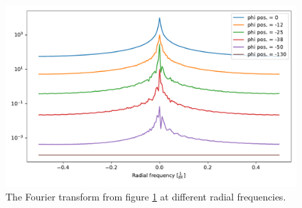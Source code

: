 \begin{figure}[H]
	\centering
		\includegraphics[width=1.0\textwidth]{pics/simspi_radialfreq.pdf}
		\caption{The Fourier transform from figure \ref{fig:simspi_radialfreq} at different radial frequencies.}
		\label{fig:simspi_radialfreq}
\end{figure}

